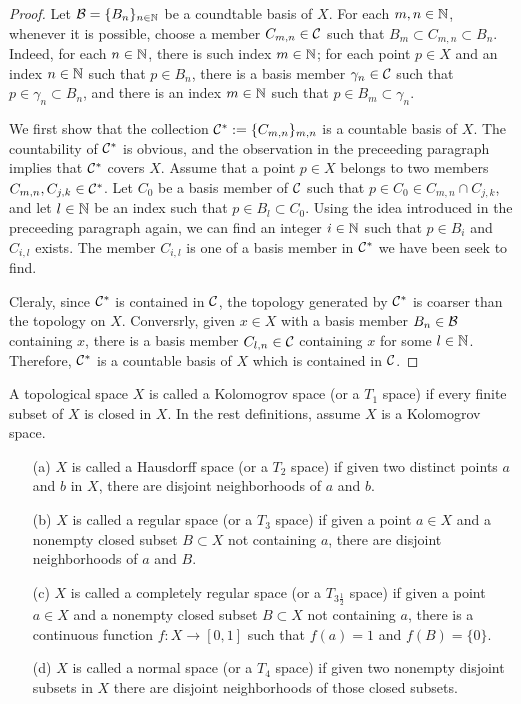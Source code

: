\begin{proof}
    Let ${\mathcal{B}}=\{B_n\}_{n\in{\mathbb{N}}}$ be a coundtable basis of $X$.
    For each $m, n\in{\mathbb{N}}$, whenever it is possible, choose a member $C_{m, n}\in{\mathcal{C}}$ such that $B_m\subset C_{m, n}\subset B_n$.
    Indeed, for each $n\in{\mathbb{N}}$, there is such index $m\in{\mathbb{N}}$; for each point $p\in X$ and an index $n\in{\mathbb{N}}$ such that $p\in B_n$, there is a basis member $\gamma_n\in{\mathcal{C}}$ such that $p\in\gamma_n\subset B_n$, and there is an index $m\in{\mathbb{N}}$ such that $p\in B_m\subset\gamma_n$.
    
    We first show that the collection ${\mathcal{C}}^*:=\{C_{m, n}\}_{m, n}$ is a countable basis of $X$.
    The countability of ${\mathcal{C}}^*$ is obvious, and the observation in the preceeding paragraph implies that ${\mathcal{C}}^*$ covers $X$.
    Assume that a point $p\in X$ belongs to two members $C_{m, n}, C_{j, k}\in{\mathcal{C}}^*$.
    Let $C_0$ be a basis member of ${\mathcal{C}}$ such that $p\in C_0\in C_{m, n}\cap C_{j, k}$, and let $l\in{\mathbb{N}}$ be an index such that $p\in B_l\subset C_0$.
    Using the idea introduced in the preceeding paragraph again, we can find an integer $i\in{\mathbb{N}}$ such that $p\in B_i$ and $C_{i, l}$ exists.
    The member $C_{i, l}$ is one of a basis member in ${\mathcal{C}}^*$ we have been seek to find.

    Cleraly, since ${\mathcal{C}}^*$ is contained in ${\mathcal{C}}$, the topology generated by ${\mathcal{C}}^*$ is coarser than the topology on $X$.
    Conversrly, given $x\in X$ with a basis member $B_n\in{\mathcal{B}}$ containing $x$, there is a basis member $C_{l, n}\in{\mathcal{C}}$ containing $x$ for some $l\in{\mathbb{N}}$.
    Therefore, ${\mathcal{C}}^*$ is a countable basis of $X$ which is contained in ${\mathcal{C}}$.
    \end{proof}
\begin{defi}
    A topological space $X$ is called a Kolomogrov space (or a $T_1$ space) if every finite subset of $X$ is closed in $X$.
    In the rest definitions, assume $X$ is a Kolomogrov space.
    \begin{enumerate}
        \item[(a)]
        {
            $X$ is called a Hausdorff space (or a $T_2$ space) if given two distinct points $a$ and $b$ in $X$, there are disjoint neighborhoods of $a$ and $b$.
        }
        \item[(b)]
        {
            $X$ is called a regular space (or a $T_3$ space) if given a point $a\in X$ and a nonempty closed subset $B\subset X$ not containing $a$, there are disjoint neighborhoods of $a$ and $B$.
        }
        \item[(c)]
        {
            $X$ is called a completely regular space (or a $T_{3\frac{1}{2}}$ space) if given a point $a\in X$ and a nonempty closed subset $B\subset X$ not containing $a$, there is a continuous function $f: X\rightarrow[0, 1]$ such that $f(a)=1$ and $f(B)=\{0\}$.
        }
        \item[(d)]
        {
            $X$ is called a normal space (or a $T_4$ space) if given two nonempty disjoint subsets in $X$ there are disjoint neighborhoods of those closed subsets.
        }
    \end{enumerate}
\end{defi}
